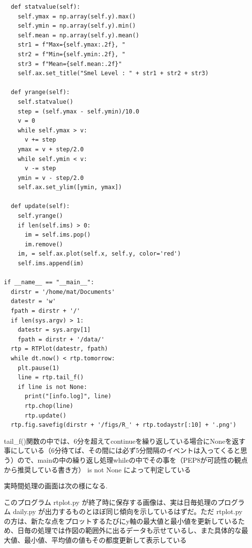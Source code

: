 \documentclass[12pt,a4paper,uplatex]{jsbook}
\begin{document}
\begin{breakbox}
\begin{verbatim}
  def statvalue(self):
    self.ymax = np.array(self.y).max()
    self.ymin = np.array(self.y).min()
    self.mean = np.array(self.y).mean()
    str1 = f"Max={self.ymax:.2f}, "
    str2 = f"Min={self.ymin:.2f}, "
    str3 = f"Mean={self.mean:.2f}"
    self.ax.set_title("Smel Level : " + str1 + str2 + str3)

  def yrange(self):
    self.statvalue()
    step = (self.ymax - self.ymin)/10.0
    v = 0
    while self.ymax > v:
      v += step
    ymax = v + step/2.0
    while self.ymin < v:
      v -= step
    ymin = v - step/2.0
    self.ax.set_ylim([ymin, ymax])

  def update(self):
    self.yrange()
    if len(self.ims) > 0:
      im = self.ims.pop()
      im.remove()
    im, = self.ax.plot(self.x, self.y, color='red')
    self.ims.append(im)

if __name__ == "__main__":
  dirstr = '/home/mat/Documents'
  datestr = 'w'
  fpath = dirstr + '/'
  if len(sys.argv) > 1:
    datestr = sys.argv[1]
    fpath = dirstr + '/data/'
  rtp = RTPlot(datestr, fpath)
  while dt.now() < rtp.tomorrow:
    plt.pause(1)
    line = rtp.tail_f()
    if line is not None:
      print("[info.log]", line)
      rtp.chop(line)
      rtp.update()
  rtp.fig.savefig(dirstr + '/figs/R_' + rtp.todaystr[:10] + '.png')
	\end{verbatim}
\end{breakbox}

tail\_f()関数の中では、6分を超えてcontinueを繰り返している場合にNoneを返す事にしている（6分待てば、その間には必ず5分間隔のイベントは入ってくると思う）ので、mainの中の繰り返し処理whileの中でその事を（PEP8が可読性の観点から推奨している書き方） is not None によって判定している

実時間処理の画面は次の様になる.

このプログラム rtplot.py が終了時に保存する画像は、実は日毎処理のプログラム daily.py が出力するものとほぼ同じ傾向を示しているはずだ。ただ rtplot.py の方は、新たな点をプロットするたびにy軸の最大値と最小値を更新しているため、日毎の処理では作図の範囲外に出るデータも示せているし、また具体的な最大値、最小値、平均値の値もその都度更新して表示している
\end{document}
